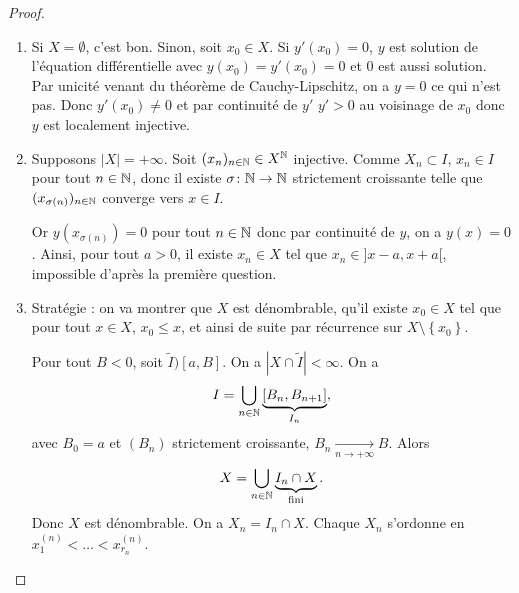 \documentclass[12pt]{article}
\begin{document}
\begin{proof}
	\phantom{}
	\begin{enumerate}
		\item Si $X=\emptyset$, c'est bon. Sinon, soit $x_0\in X$. Si $y'(x_0)=0$, $y$ est solution de l'équation différentielle avec $y(x_0)=y'(x_0)=0$ et 0 est aussi solution. Par unicité venant du théorème de Cauchy-Lipschitz, on a $y=0$ ce qui n'est pas. Donc $y'(x_0)\neq0$ et par continuité de $y'$ $y'>0$ au voisinage de $x_0$ donc $y$ est localement injective.
		
		\item Supposons $\left\lvert X\right\rvert=+\infty$. Soit $(x_n)_{n\in\mathbb{N}}\in X^{\mathbb{N}}$ injective. Comme $X_n\subset I$, $x_n\in I$ pour tout $n\in\mathbb{N}$, donc il existe $\sigma\colon\mathbb{N}\to\mathbb{N}$ strictement croissante telle que $(x_{\sigma(n)})_{n\in\mathbb{N}}$ converge vers $x\in I$.
		
		Or $y(x_{\sigma(n)})=0$ pour tout $n\in\mathbb{N}$ donc par continuité de $y$, on a $y(x)=0$. Ainsi, pour tout $a>0$, il existe $x_n\in X$ tel que $x_n\in]x-a,x+a[$, impossible d'après la première question.

		\item Stratégie : on va montrer que $X$ est dénombrable, qu'il existe $x_0\in X$ tel que pour tout $x\in X$, $x_0\leqslant x$, et ainsi de suite par récurrence sur $X\setminus\left\lbrace x_0\right\rbrace$.
		
		Pour tout $B<0$, soit $\widetilde{I})[a,B]$. On a $\left\lvert X\cap\widetilde{I}\right\rvert<\infty$. On a 
		\begin{equation}
			I=\bigcup_{n\in\mathbb{N}}\underbrace{[B_n, B_{n+1}]}_{I_n},
		\end{equation}
		avec $B_0=a$ et $(B_n)$ strictement croissante, $B_n\xrightarrow[n\to+\infty]{}B$. Alors 
		\begin{equation}
			X=\bigcup_{n\in\mathbb{N}}\underbrace{I_n\cap X}_{{\text{fini}}}.
		\end{equation}
		Donc $X$ est dénombrable. On a $X_n=I_n\cap X$. Chaque $X_n$ s'ordonne en $x_1^{(n)}<\dots<x_{r_n}^{(n)}$.
	\end{enumerate}
\end{proof}
\end{document}
